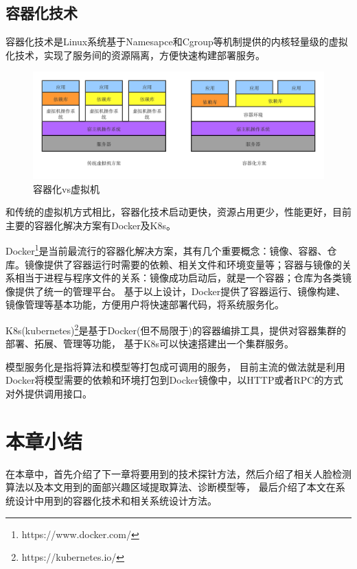 \subsection{容器化技术}
容器化技术是Linux系统基于Namesapce和Cgroup等机制提供的内核轻量级的虚拟化技术，实现了服务间的资源隔离，方便快速构建部署服务。

\begin{figure}
    \centering
    \includegraphics[width=12cm]{images/container.png}
    \caption{容器化vs虚拟机}
    \label{fig:container}
\end{figure}

和传统的虚拟机方式相比，容器化技术启动更快，资源占用更少，性能更好，目前主要的容器化解决方案有Docker及K8s。

Docker\footnote{https://www.docker.com/}是当前最流行的容器化解决方案，其有几个重要概念：镜像、容器、仓库。镜像提供了容器运行时需要的依赖、相关文件和环境变量等；容器与镜像的关系相当于进程与程序文件的关系：镜像成功启动后，就是一个容器；仓库为各类镜像提供了统一的管理平台。
基于以上设计，Docker提供了容器运行、镜像构建、镜像管理等基本功能，方便用户将快速部署代码，将系统服务化。

K8s(kubernetes)\footnote{https://kubernetes.io/}是基于Docker(但不局限于)的容器编排工具，提供对容器集群的部署、拓展、管理等功能，
基于K8s可以快速搭建出一个集群服务。

模型服务化是指将算法和模型等打包成可调用的服务，
目前主流的做法就是利用Docker将模型需要的依赖和环境打包到Docker镜像中，以HTTP或者RPC的方式对外提供调用接口。

\section{本章小结}
在本章中，首先介绍了下一章将要用到的技术探针方法，然后介绍了相关人脸检测算法以及本文用到的面部兴趣区域提取算法、诊断模型等，
最后介绍了本文在系统设计中用到的容器化技术和相关系统设计方法。